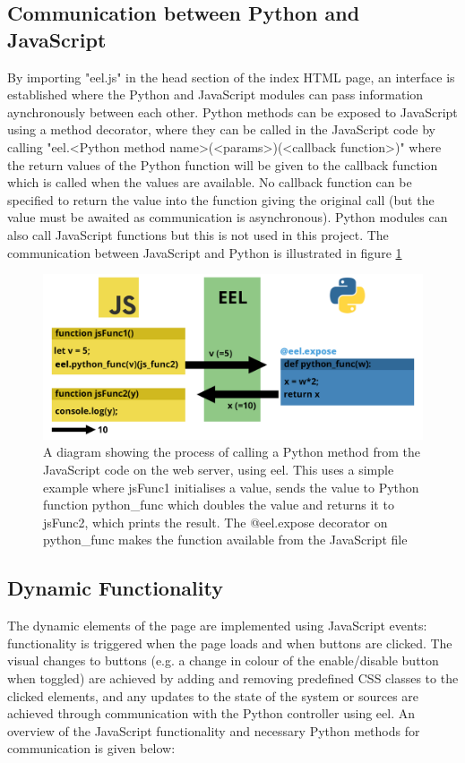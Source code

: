 \documentclass{l4proj}
\begin{document}
\subsection{Communication between Python and JavaScript}
By importing "eel.js" in the head section of the index HTML page, an interface is established where the Python and JavaScript modules can pass information aynchronously between each other. Python methods can be exposed to JavaScript using a method decorator, where they can be called in the JavaScript code by calling "eel.<Python method name>(<params>)(<callback function>)" where the return values of the Python function will be given to the callback function which is called when the values are available. No callback function can be specified to return the value into the function giving the original call (but the value must be awaited as communication is asynchronous). Python modules can also call JavaScript functions but this is not used in this project. The communication between JavaScript and Python is illustrated in figure \ref{fig:eel-communication}

\begin{figure}[!ht]
\includegraphics[width=\textwidth]{images/eel-communication.png}
\caption{A diagram showing the process of calling a Python method from the JavaScript code on the web server, using eel. This uses a simple example where jsFunc1 initialises a value, sends the value to Python function python\_func which doubles the value and returns it to jsFunc2, which prints the result. The @eel.expose decorator on python\_func makes the function available from the JavaScript file}
\label{fig:eel-communication}
\end{figure}

\subsection{Dynamic Functionality}
The dynamic elements of the page are implemented using JavaScript events: functionality is triggered when the page loads and when buttons are clicked. The visual changes to buttons (e.g. a change in colour of the enable/disable button when toggled) are achieved by adding and removing predefined CSS classes to the clicked elements, and any updates to the state of the system or sources are achieved through communication with the Python controller using eel. An overview of the JavaScript functionality and necessary Python methods for communication is given below:
\end{document}
